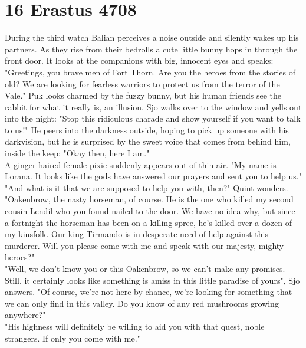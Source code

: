 \section{16 Erastus 4708}

During the third watch Balian perceives a noise outside and silently wakes up his partners. As they rise from their bedrolls a cute little bunny hops in through the front door. It looks at the companions with big, innocent eyes and speaks: "Greetings, you brave men of Fort Thorn. Are you the heroes from the stories of old? We are looking for fearless warriors to protect us from the terror of the Vale." Puk looks charmed by the fuzzy bunny, but his human friends see the rabbit for what it really is, an illusion. Sjo walks over to the window and yells out into the night: "Stop this ridiculous charade and show yourself if you want to talk to us!" He peers into the darkness outside, hoping to pick up someone with his darkvision, but he is surprised by the sweet voice that comes from behind him, inside the keep: "Okay then, here I am."\\

A ginger-haired female pixie suddenly appears out of thin air. "My name is Lorana. It looks like the gods have answered our prayers and sent you to help us."\\

"And what is it that we are supposed to help you with, then?" Quint wonders.\\

"Oakenbrow, the nasty horseman, of course. He is the one who killed my second cousin Lendil who you found nailed to the door. We have no idea why, but since a fortnight the horseman has been on a killing spree, he's killed over a dozen of my kinsfolk. Our king Tirmando is in desperate need of help against this murderer. Will you please come with me and speak with our majesty, mighty heroes?"\\

"Well, we don't know you or this Oakenbrow, so we can't make any promises. Still, it certainly looks like something is amiss in this little paradise of yours", Sjo answers. "Of course, we're not here by chance, we're looking for something that we can only find in this valley. Do you know of any red mushrooms growing anywhere?"\\

"His highness will definitely be willing to aid you with that quest, noble strangers. If only you come with me."\\

